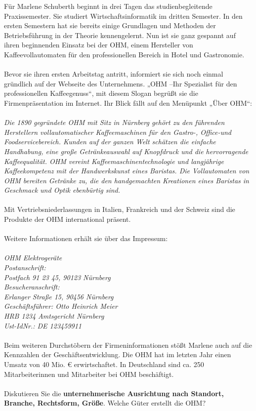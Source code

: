Für Marlene Schuberth beginnt in drei Tagen das studienbegleitende Praxissemester. Sie studiert
Wirtschaftsinformatik im dritten Semester. In den ersten Semestern hat sie bereits einige Grundlagen und
Methoden der Betriebsführung in der Theorie kennengelernt. Nun ist sie ganz gespannt auf ihren beginnenden
Einsatz bei der OHM, einem Hersteller von Kaffeevollautomaten für den professionellen Bereich in Hotel und
Gastronomie.
\\~\\
Bevor sie ihren ersten Arbeitstag antritt, informiert sie sich noch einmal gründlich auf der Webseite des
Unternehmens. „OHM –Ihr Spezialist für den professionellen Kaffeegenuss“, mit diesem Slogan begrüßt sie die
Firmenpräsentation im Internet. Ihr Blick fällt auf den Menüpunkt „Über OHM“:
\\~\\
\textit{
Die 1890 gegründete OHM mit Sitz in Nürnberg gehört zu den führenden Herstellern vollautomatischer
Kaffeemaschinen für den Gastro-, Office-und Foodservicebereich. Kunden auf der ganzen Welt schätzen die
einfache Handhabung, eine große Getränkeauswahl auf Knopfdruck und die hervorragende Kaffeequalität. OHM
vereint Kaffeemaschinentechnologie und langjährige Kaffeekompetenz mit der Handwerkskunst eines Baristas.
Die Vollautomaten von OHM bereiten Getränke zu, die den handgemachten Kreationen eines Baristas in
Geschmack und Optik ebenbürtig sind.
}
\\~\\
Mit Vertriebsniederlassungen in Italien, Frankreich und der Schweiz sind die Produkte der OHM international
präsent.
\\~\\
Weitere Informationen erhält sie über das Impressum:
\\~\\
\textit{
OHM Elektrogeräte\\
Postanschrift:\\
Postfach 91 23 45, 90123 Nürnberg\\
Besucheranschrift:\\
Erlanger Straße 15, 90456 Nürnberg\\
Geschäftsführer: Otto Heinrich Meier\\
HRB 1234 Amtsgericht Nürnberg\\
Ust-IdNr.: DE 123459911
}
\\~\\
Beim weiteren Durchstöbern der Firmeninformationen stößt Marlene auch auf die Kennzahlen der
Geschäftsentwicklung. Die OHM hat im letzten Jahr einen Umsatz von 40 Mio. € erwirtschaftet.
In Deutschland sind ca. 250 Mitarbeiterinnen und Mitarbeiter bei OHM beschäftigt.
\\~\\
Diskutieren Sie die \textbf{unternehmerische Ausrichtung nach Standort, Branche, Rechtsform, Größe}.
Welche Güter erstellt die OHM?

